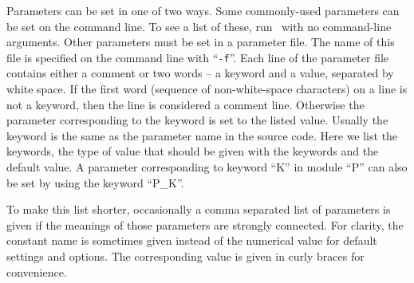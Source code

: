 
\label{parameter_file}
Parameters can be set in one of two ways. Some commonly-used parameters can be
set on the command line. To see a list of these, run \BB\ with no command-line
arguments. Other parameters must be set in a parameter file. The name of this
file is specified on the command line with ``\texttt{-f}''.  Each line of the
parameter file contains either a comment or two words -- a keyword and a
value, separated by white space. If the first word (sequence of
non-white-space characters) on a line is not a keyword, then the line is
considered a comment line. Otherwise the parameter corresponding to the
keyword is set to the listed value. Usually the keyword is the same as the
parameter name in the source code. Here we list the keywords, the type of
value that should be given with the keywords and the default value. A
parameter corresponding to keyword ``K'' in module ``P'' can also be set by
using the keyword ``P\_K''.

To make this list shorter, occasionally a comma separated list of parameters
is given if the meanings of those parameters are strongly
connected. For clarity, the constant name is sometimes given instead
of the numerical value for default settings and options. The
corresponding value is given in curly braces for convenience.

